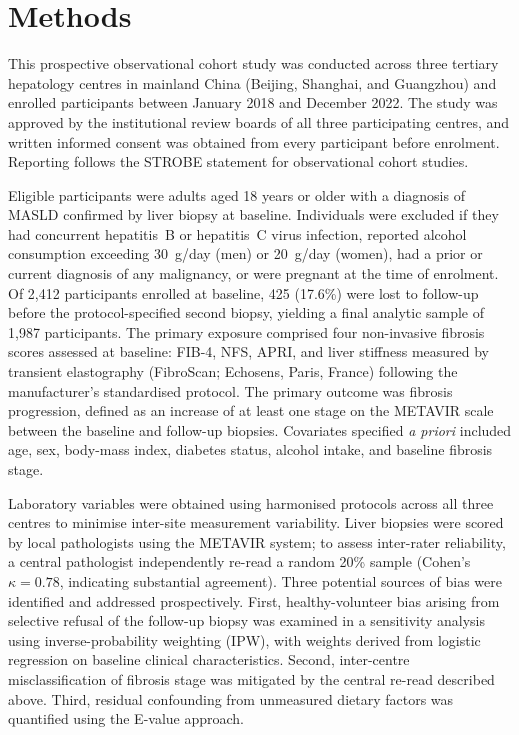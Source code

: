 \documentclass[11pt,a4paper]{article}
\newcommand{\masld}{\textsc{MASLD}\xspace}
\newcommand{\metavir}{\textsc{METAVIR}\xspace}
\newcommand{\fibfour}{FIB-4\xspace}
\newcommand{\nfs}{\textsc{NFS}\xspace}
\newcommand{\apri}{\textsc{APRI}\xspace}
\newcommand{\te}{transient elastography\xspace}
\newcommand{\ipw}{\textsc{IPW}\xspace}
\newcommand{\strobe}{\textsc{STROBE}\xspace}
\begin{document}
\section*{Methods}

This prospective observational cohort study was conducted across three tertiary hepatology
centres in mainland China (Beijing, Shanghai, and Guangzhou) and enrolled participants
between January 2018 and December 2022. The study was approved by the institutional review
boards of all three participating centres, and written informed consent was obtained from
every participant before enrolment. Reporting follows the \strobe statement for observational
cohort studies.

Eligible participants were adults aged 18 years or older with a diagnosis of \masld confirmed
by liver biopsy at baseline. Individuals were excluded if they had concurrent hepatitis~B or
hepatitis~C virus infection, reported alcohol consumption exceeding 30~g/day (men) or
20~g/day (women), had a prior or current diagnosis of any malignancy, or were pregnant at
the time of enrolment. Of 2{,}412 participants enrolled at baseline, 425 (17.6\%) were lost
to follow-up before the protocol-specified second biopsy, yielding a final analytic sample of
1{,}987 participants. The primary exposure comprised four non-invasive fibrosis scores
assessed at baseline: \fibfour, \nfs, \apri, and liver stiffness measured by \te
(FibroScan; Echosens, Paris, France) following the manufacturer's standardised protocol.
The primary outcome was fibrosis progression, defined as an increase of at least one stage
on the \metavir scale between the baseline and follow-up biopsies. Covariates specified
\textit{a priori} included age, sex, body-mass index, diabetes status, alcohol intake, and
baseline fibrosis stage.

Laboratory variables were obtained using harmonised protocols across all three centres to
minimise inter-site measurement variability. Liver biopsies were scored by local pathologists
using the \metavir system; to assess inter-rater reliability, a central pathologist
independently re-read a random 20\% sample (Cohen's $\kappa = 0.78$, indicating substantial
agreement). Three potential sources of bias were identified and addressed prospectively.
First, healthy-volunteer bias arising from selective refusal of the follow-up biopsy was
examined in a sensitivity analysis using inverse-probability weighting (\ipw), with weights
derived from logistic regression on baseline clinical characteristics. Second, inter-centre
misclassification of fibrosis stage was mitigated by the central re-read described above.
Third, residual confounding from unmeasured dietary factors was quantified using the
E-value approach.
\end{document}
